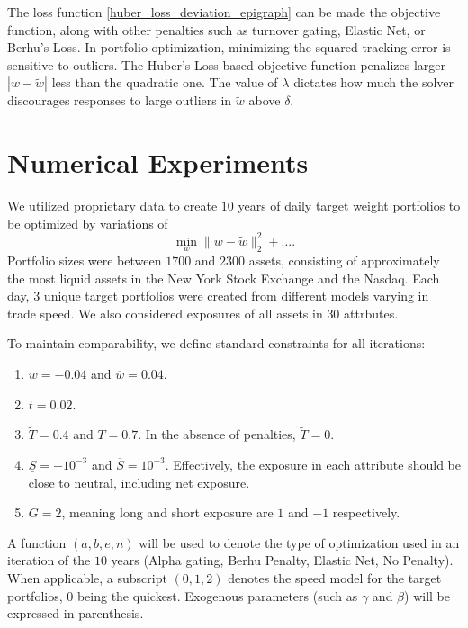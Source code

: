 \documentclass[11pt, letterpaper]{article}
\begin{document}
The loss function \eqref{huber_loss_deviation_epigraph} can be made the objective function, along with other penalties such as
turnover gating, Elastic Net, or Berhu's Loss. In portfolio optimization, minimizing the squared tracking error is sensitive to
outliers. The Huber's Loss based objective function penalizes larger $|w - \tilde{w}|$ less than the quadratic one. The value of $\lambda$ dictates how
much the solver discourages responses to large outliers in $\tilde{w}$ above $\delta$.

\section{Numerical Experiments}
We utilized proprietary data to create $10$ years of daily target weight portfolios to be optimized by variations of
\begin{equation*}
	\underset{w}{\min} \lVert w - \tilde{w}\rVert_2^2 + \dots.
\end{equation*}
Portfolio sizes were between $1700$ and $2300$ assets, consisting of approximately the most liquid assets in the New York Stock Exchange and the Nasdaq. Each day, $3$ unique target portfolios were created from different models varying in trade speed. We also considered exposures of all assets in $30$ attrbutes.

To maintain comparability, we define standard constraints for all iterations:
\begin{enumerate}
    \item $\underline{w} = -0.04$ and $\overline{w} = 0.04$.
    \item $t = 0.02$.
    \item $\tilde{T} = 0.4$ and $T = 0.7$. In the absence of penalties, $\tilde{T} = 0$.
	\item $\underline{S} = -10^{-3}$ and $\overline{S} = 10^{-3}$. Effectively, the exposure in each attribute should be close to neutral, including net exposure.
	\item $G = 2$, meaning long and short exposure are $1$ and $-1$ respectively.
\end{enumerate}

A function $(a,b,e,n)$ will be used to denote the type of optimization used in an iteration of the $10$ years (Alpha gating, Berhu Penalty, Elastic Net, No Penalty). When applicable, a subscript $(0,1,2)$ denotes the speed model for the target portfolios, $0$ being the quickest. Exogenous parameters (such as $\gamma$ and $\beta$) will be expressed in parenthesis.
\end{document}
